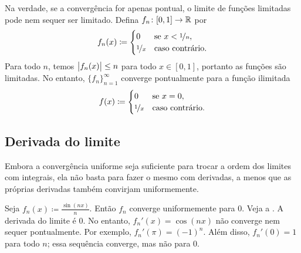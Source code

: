 \begin{example}
Na verdade, se a convergência for apenas pontual, o limite de funções
limitadas pode nem sequer ser limitado.
Defina $f_n \colon [0,1] \to {\mathbb{R}}$ por
\begin{equation*}
f_n(x) \coloneqq
\begin{cases}
0 & \text{se } x < \nicefrac{1}{n},\\
\nicefrac{1}{x} & \text{caso contrário.}
\end{cases}
\end{equation*}
Para todo $n$, temos $\bigl\lvert {f_n(x)} \bigr\rvert \leq n$ para todo $x \in [0,1]$,
portanto as funções são limitadas. No entanto,
$\{ f_n \}_{n=1}^\infty$ converge pontualmente para a função ilimitada
\begin{equation*}
f(x) \coloneqq
\begin{cases}
0 & \text{se } x = 0,\\
\nicefrac{1}{x} & \text{caso contrário.}
\end{cases}
\end{equation*}
\end{example}

\subsection{Derivada do limite}

Embora a convergência uniforme seja suficiente para trocar a ordem dos
limites com integrais, ela não basta para fazer o mesmo com derivadas, a
menos que as próprias derivadas também convirjam uniformemente.

\begin{example}
Seja $f_n(x) \coloneqq \frac{\sin(nx)}{n}$. Então $f_n$ converge
uniformemente para 0. Veja a .
A derivada do limite é 0. No entanto, $f_n'(x) = \cos(nx)$ não converge
nem sequer pontualmente.
Por exemplo, $f_n'(\pi) = {(-1)}^n$.
Além disso, $f_n'(0) = 1$ para todo $n$; essa sequência converge, mas não
para 0.
\begin{myfigureht}
\caption{Gráficos de $\frac{\sin(nx)}{n}$ para
$n=1,2,\ldots,10$, com os valores maiores de $n$ em tons mais claros de cinza.%
\label{fig:conv1nsinxn}}
\end{myfigureht}
\end{example}

